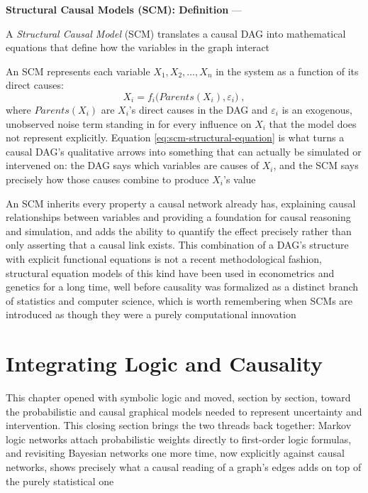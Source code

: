 \textbf{Structural Causal Models (SCM): Definition} --- \begin{definition}
  A \emph{Structural Causal Model} (SCM) translates a causal DAG into
  mathematical equations that define how the variables in the graph
  interact
\end{definition}
An SCM represents each variable $X_1, X_2, \ldots, X_n$ in the system as a
function of its direct causes:
\begin{equation}
  \label{eq:scm-structural-equation}
  X_i = f_i\bigl(Parents(X_i), \varepsilon_i\bigr)\;,
\end{equation}
where $Parents(X_i)$ are $X_i$'s direct causes in the DAG and $\varepsilon_i$
is an exogenous, unobserved noise term standing in for every influence on
$X_i$ that the model does not represent explicitly. Equation
\eqref{eq:scm-structural-equation} is what turns a causal DAG's qualitative
arrows into something that can actually be simulated or intervened on: the
DAG says which variables are causes of $X_i$, and the SCM says precisely
how those causes combine to produce $X_i$'s value

An SCM inherits every property a causal network already has, explaining
causal relationships between variables and providing a foundation for
causal reasoning and simulation, and adds the ability to quantify the
effect precisely rather than only asserting that a causal link exists.
This combination of a DAG's structure with explicit functional equations
is not a recent methodological fashion, structural equation models of this
kind have been used in econometrics and genetics for a long time, well
before causality was formalized as a distinct branch of statistics and
computer science, which is worth remembering when SCMs are introduced as
though they were a purely computational innovation

\section{Integrating Logic and Causality}
\label{sec:integrating-logic-causality}

This chapter opened with symbolic logic and moved, section by section,
toward the probabilistic and causal graphical models needed to represent
uncertainty and intervention. This closing section brings the two threads
back together: Markov logic networks attach probabilistic weights directly
to first-order logic formulas, and revisiting Bayesian networks one more
time, now explicitly against causal networks, shows precisely what a
causal reading of a graph's edges adds on top of the purely statistical
one

